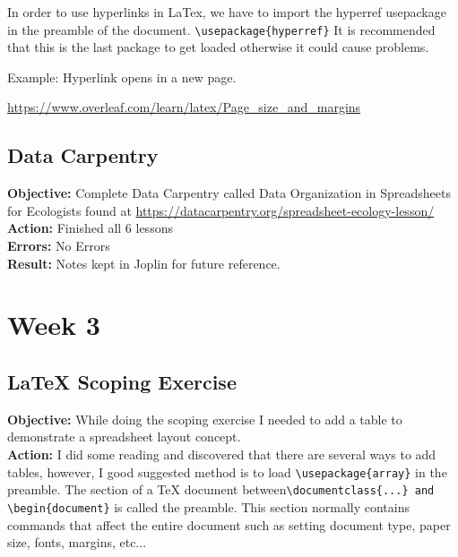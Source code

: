 \documentclass[a4paper,12pt]{article}
\begin{document}
\normalsize 

In order to use hyperlinks in LaTex, we have to import the hyperref usepackage in the preamble of the document. \verb|\usepackage{hyperref}| It is recommended that this is the last package to get loaded otherwise it could cause problems.

Example: Hyperlink opens in a new page.

\url{https://www.overleaf.com/learn/latex/Page_size_and_margins}

\subsection{Data Carpentry}

\noindent \textbf{Objective:} Complete Data Carpentry called Data Organization in Spreadsheets for Ecologists found at \url{https://datacarpentry.org/spreadsheet-ecology-lesson/}\\

\noindent \textbf{Action:} Finished all 6 lessons\\

\noindent \textbf{Errors:} No Errors\\

\noindent \textbf{Result:} Notes kept in Joplin for future reference. \\

\newpage

\section{Week 3}

\subsection{LaTeX Scoping Exercise}

\noindent \textbf{Objective:} While doing the scoping exercise I needed to add a table to demonstrate a spreadsheet layout concept.\\

\noindent \textbf{Action:} I did some reading and discovered that there are several ways to add tables, however, I good suggested method is to load \verb|\usepackage{array}| in the preamble. The section of a TeX document between\verb|\documentclass{...} and \begin{document}| is called the preamble. This section normally contains commands that affect the entire document such as setting document type, paper size, fonts, margins, etc...\\
\end{document}
